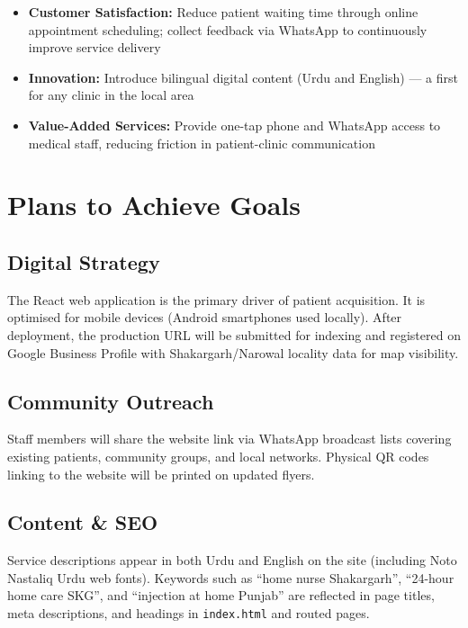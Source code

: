 \documentclass[12pt, a4paper]{article}
\begin{document}
\begin{itemize}[leftmargin=1.4em]
    \item \textbf{Customer Satisfaction:} Reduce patient waiting time through online appointment scheduling; collect feedback via WhatsApp to continuously improve service delivery
    \item \textbf{Innovation:} Introduce bilingual digital content (Urdu and English) — a first for any clinic in the local area
    \item \textbf{Value-Added Services:} Provide one-tap phone and WhatsApp access to medical staff, reducing friction in patient-clinic communication
\end{itemize}

\newpage

\section{Plans to Achieve Goals}

\subsection{Digital Strategy}
The React web application is the primary driver of patient acquisition. It is optimised for mobile devices (Android smartphones used locally). After deployment, the production URL will be submitted for indexing and registered on Google Business Profile with Shakargarh/Narowal locality data for map visibility.

\subsection{Community Outreach}
Staff members will share the website link via WhatsApp broadcast lists covering existing patients, community groups, and local networks. Physical QR codes linking to the website will be printed on updated flyers.

\subsection{Content \& SEO}
Service descriptions appear in both Urdu and English on the site (including Noto Nastaliq Urdu web fonts). Keywords such as ``home nurse Shakargarh'', ``24-hour home care SKG'', and ``injection at home Punjab'' are reflected in page titles, meta descriptions, and headings in \texttt{index.html} and routed pages.
\end{document}
